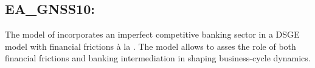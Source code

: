 \documentclass[11pt,a4paper]{article}
\begin{document}
	
	\subsection{EA\_GNSS10: \cite{Geralietal2010}}
	\label{EAGNSS10}
	
	The model of \cite{Geralietal2010} incorporates an imperfect competitive banking sector in a DSGE model with financial frictions \`{a} la \cite{Iacoviello2005}. The model allows to asses the role of both financial frictions and banking intermediation in shaping business-cycle dynamics.
	
\end{document}
